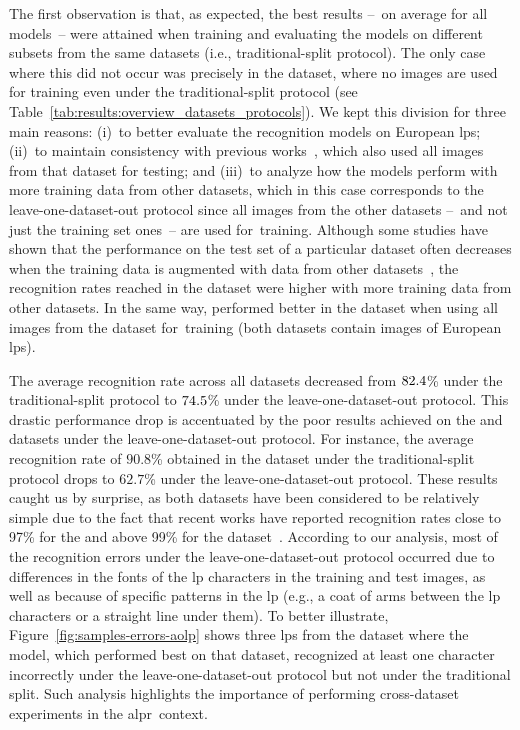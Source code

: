 The first observation is that, as expected, the best results --~on average for all models~-- were attained when training and evaluating the models on different subsets from the same datasets (i.e., traditional-split protocol).
The only case where this did not occur was precisely in the \openalpreu dataset, where no images are used for training even under the traditional-split protocol (see Table~\ref{tab:results:overview_datasets_protocols}).
We kept this division for three main reasons: (i)~to better evaluate the recognition models on European \glspl*{lp}; (ii)~to maintain consistency with previous works~\citep{masood2017sighthound,laroca2021efficient,silva2022flexible}, which also used all images from that dataset for testing; and (iii)~to analyze how the models perform with more training data from other datasets, which in this case corresponds to the leave-one-dataset-out protocol since all images from the other datasets --~and not just the training set ones~-- are used for~training.
Although some studies have shown that the performance on the test set of a particular dataset often decreases when the training data is augmented with data from other datasets~\citep{torralba2011unbiased,khosla2012undoing}, the recognition rates reached in the \openalpreu dataset were higher with more training data from other datasets.
In the same way, \crnet performed better in the \englishlp dataset when using all images from the \openalpreu dataset for~training (both datasets contain images of European \glspl*{lp}). 

The average recognition rate across all datasets decreased from $82.4$\% under the traditional-split protocol to $74.5$\% under the leave-one-dataset-out protocol.
This drastic performance drop is accentuated by the poor results achieved on the \englishlp and \aolp datasets under the leave-one-dataset-out protocol.
For instance, the average recognition rate of $90.8$\% obtained in the \aolp dataset under the traditional-split protocol drops to $62.7$\% under the leave-one-dataset-out protocol.
These results caught us by surprise, as both datasets have been considered to be relatively simple due to the fact that recent works have reported recognition rates close to 97\% for the \englishlp and above 99\% for the \aolp dataset~\citep{henry2020multinational,laroca2021efficient,silva2022flexible,wang2022rethinking}.
According to our analysis, most of the recognition errors under the leave-one-dataset-out protocol occurred due to differences in the fonts of the \gls*{lp} characters in the training and test images, as well as because of specific patterns in the \gls*{lp} (e.g., a coat of arms between the \gls*{lp} characters or a straight line under them).
To better illustrate, Figure~\ref{fig:samples-errors-aolp} shows three \glspl*{lp} from the \aolp dataset where the \trba model, which performed best on that dataset, recognized at least one character incorrectly under the leave-one-dataset-out protocol but not under the traditional split.
Such analysis highlights the importance of performing cross-dataset experiments in the \gls*{alpr}~context.

